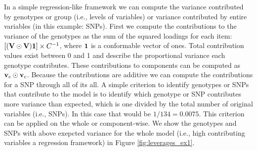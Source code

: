 \documentclass[12pt]{article}
\begin{document}
In a simple regression-like framework we can compute the variance
contributed by genotypes or group (i.e., levels of variables) or
variance contributed by entire variables (in this example: SNPs). First
we compute the contributions to the variance of the genotypes as the sum
of the squared loadings for each item:
\([({\bf V} \odot {\bf V}){\bf 1}] \times C^{-1}\), where \({\bf 1}\) is
a conformable vector of ones. Total contribution values exist between 0
and 1 and describe the proportional variance each genotype contributes.
These contributions to components can be computed as
\({\bf v}_{c} \odot {\bf v}_{c}\). Because the contributions are
additive we can compute the contributions for a SNP through all of its
all. A simple criterion to identify genotypes or SNPs that contribute to
the model is to identify which genotype or SNP contributes more variance
than expected, which is one divided by the total number of original
variables (i.e., SNPs). In this case that would be \(1/ 134 = 0.0075\).
This criterion can be applied on the whole or component-wise. We show
the genotypes and SNPs with above exepcted variance for the whole model
(i.e., high contributing variables a regression framework) in Figure
\ref{fig:leverages_ex1}.
\end{document}
